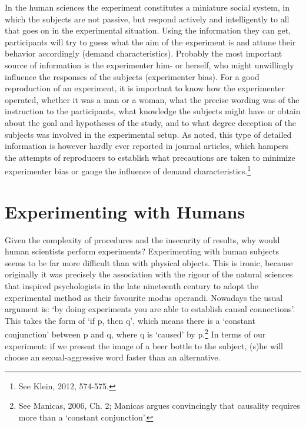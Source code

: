 \documentclass[twocolumn, serif, review, authordate]{jote-article}
\begin{document}
In the human sciences the experiment constitutes a miniature social system, in which the subjects are not passive, but respond actively and intelligently to all that goes on in the experimental situation. Using the information they can get, participants will try to guess what the aim of the experiment is and attune their behavior accordingly (demand characteristics). Probably the most important source of information is the experimenter him- or herself, who might unwillingly influence the responses of the subjects (experimenter bias). For a good reproduction of an experiment, it is important to know how the experimenter operated, whether it was a man or a woman, what the precise wording was of the instruction to the participants, what knowledge the subjects might have or obtain about the goal and hypotheses of the study, and to what degree deception of the subjects was involved in the experimental setup. As noted, this type of detailed information is however hardly ever reported in journal articles, which hampers the attempts of reproducers to establish what precautions are taken to minimize experimenter bias or gauge the influence of demand characteristics.\footnote{ See Klein, 2012, 574-575.}


{}
\section*{Experimenting with Humans}
\gotoreview
\label{sec:humans}
\noindent Given the complexity of procedures and the insecurity of results, why would human scientists perform experiments? Experimenting with human subjects seems to be far more difficult than with physical objects. This is ironic, because originally it was precisely the association with the rigour of the natural sciences that inspired psychologists in the late nineteenth century to adopt the experimental method as their favourite modus operandi. Nowadays the usual argument is: `by doing experiments you are able to establish causal connections'. This takes the form of `if p, then q', which means there is a `constant conjunction' between p and q, where q is `caused' by p.\footnote{ See Manicas, 2006, Ch. 2; Manicas argues convincingly that causality requires more than a `constant conjunction'.} In terms of our experiment: if we present the image of a beer bottle to the subject, (s)he will choose an sexual-aggressive word faster than an alternative. 
\end{document}
